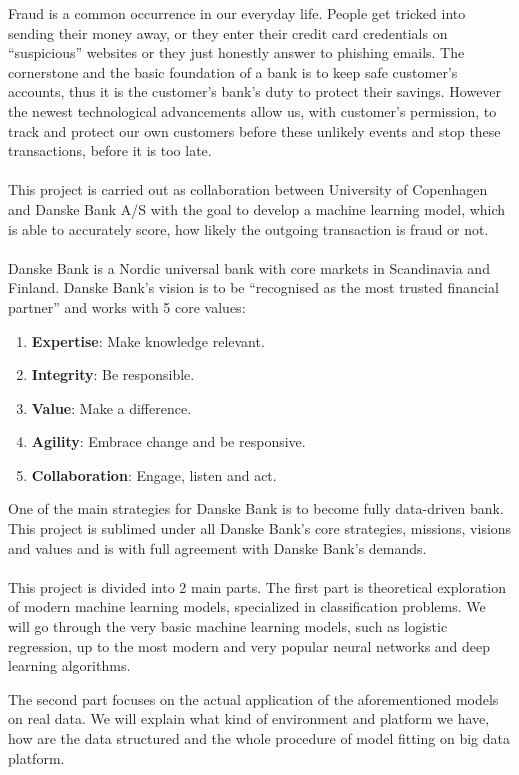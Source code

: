 \documentclass[12pt, a4paper]{report}
\theoremstyle{plain}
\theoremstyle{plain}
\theoremstyle{remark}
\begin{document}
\pagestyle{plain}
\setcounter{page}{1}

Fraud is a common occurrence in our everyday life. People get tricked into sending their money away, or they enter their credit card credentials on ``suspicious'' websites or they just honestly answer to phishing emails. The cornerstone and the basic foundation of a bank is to keep safe customer's accounts, thus it is the customer's bank's duty to protect their savings. However the newest technological advancements allow us, with customer's permission, to track and protect our own customers before these unlikely events and stop these transactions, before it is too late.\\
\\
This project is carried out as collaboration between University of Copenhagen and Danske Bank A/S with the goal to develop a machine learning model, which is able to accurately score, how likely the outgoing transaction is fraud or not.\\
\\
Danske Bank is a Nordic universal bank with core markets in Scandinavia and Finland. Danske Bank's vision is to be ``recognised as the most trusted financial partner'' and works with 5 core values:
\begin{enumerate}
\item \textbf{Expertise}: Make knowledge relevant.
\item \textbf{Integrity}: Be responsible.
\item \textbf{Value}: Make a difference.
\item \textbf{Agility}: Embrace change and be responsive.
\item \textbf{Collaboration}: Engage, listen and act.
\end{enumerate}
One of the main strategies for Danske Bank is to become fully data-driven bank. This project is sublimed under all Danske Bank's core strategies, missions, visions and values and is with full agreement with Danske Bank's demands.\\
\\
This project is divided into 2 main parts. The first part is theoretical exploration of modern machine learning models, specialized in classification problems. We will go through the very basic machine learning models, such as logistic regression, up to the most modern and very popular neural networks and deep learning algorithms.

The second part focuses on the actual application of the aforementioned models on real data. We will explain what kind of environment and platform we have, how are the data structured and the whole procedure of model fitting on big data platform.
\end{document}
